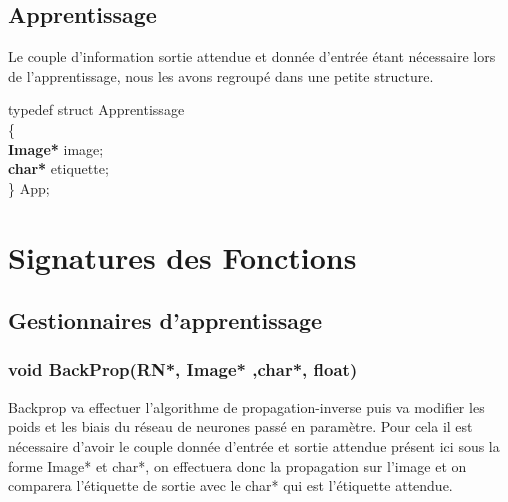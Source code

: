 \documentclass{article}
\newcommand\tab[1][1cm]{\hspace*{#1}}
\begin{document}
	\subsection{Apprentissage}
	Le couple d'information sortie attendue et donnée d'entrée étant nécessaire lors de l'apprentissage, nous les avons regroupé dans une petite structure.
	\begin{flushleft}
		typedef struct Apprentissage\\
			\{\\
				\tab \textcolor{myblue}{\textbf{Image*}} image;\\
				\tab \textcolor{myblue}{\textbf{char*}} etiquette;\\
			\} App;
	\end{flushleft}
	
	\newpage
	
	
	
	
	
	
\section{Signatures des Fonctions}
	\subsection{Gestionnaires d'apprentissage}
			\subsubsection{\textcolor{myblue}{\textbf{void}} BackProp(\textcolor{myblue}{\textbf{RN*}}, \textcolor{myblue}{\textbf{Image*}} ,\textcolor{myblue}{\textbf{char*}}, \textcolor{myblue}{\textbf{float}})}
				Backprop va effectuer l'algorithme de propagation-inverse puis va modifier les poids et les biais du réseau de neurones passé en paramètre. Pour cela il est nécessaire d'avoir le couple donnée d'entrée et sortie attendue présent ici sous la forme Image* et char*, on effectuera donc la propagation sur l'image et on comparera l'étiquette de sortie avec le char* qui est l'étiquette attendue.
				
\end{document}
